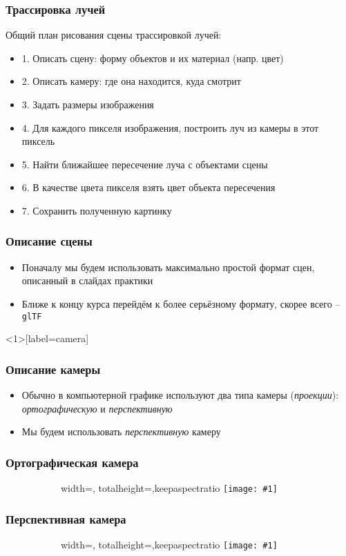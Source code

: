 \documentclass[10pt]{beamer}
\newcommand{\slideimage}[1]{
  \begin{figure}
    \begin{adjustbox}{width=\textwidth, totalheight=\textheight-2\baselineskip-2\baselineskip,keepaspectratio}
      \texttt{[image: \#1]}
    \end{adjustbox}
  \end{figure}
}
\begin{document}
\begin{frame}
\frametitle{Трассировка лучей}
Общий план рисования сцены трассировкой лучей:
\pause
\begin{itemize}
\item 1. Описать сцену: форму объектов и их материал (напр. цвет)
\pause
\item 2. Описать камеру: где она находится, куда смотрит
\pause
\item 3. Задать размеры изображения
\pause
\item 4. Для каждого пикселя изображения, построить луч из камеры в этот пиксель
\pause
\item 5. Найти ближайшее пересечение луча с объектами сцены
\pause
\item 6. В качестве цвета пикселя взять цвет объекта пересечения
\pause
\item 7. Сохранить полученную картинку
\end{itemize}
\end{frame}

\begin{frame}
\frametitle{Описание сцены}
\begin{itemize}
\item Поначалу мы будем использовать максимально простой формат сцен, описанный в слайдах практики
\pause
\item Ближе к концу курса перейдём к более серьёзному формату, скорее всего -- \texttt{glTF}
\end{itemize}
\end{frame}

\begin{frame}<1>[label=camera]
\frametitle{Описание камеры}
\begin{itemize}
\item Обычно в компьютерной графике используют два типа камеры (\textit{проекции}): \textit{ортографическую} и \textit{перспективную}
\pause
\item Мы будем использовать \textit{перспективную} камеру
\end{itemize}
\end{frame}

\begin{frame}
\frametitle{Ортографическая камера}
\begin{figure}
\slideimage{orthographic.png}
\end{figure}
\end{frame}

\begin{frame}
\frametitle{Перспективная камера}
\begin{figure}
\slideimage{perspective.png}
\end{figure}
\end{frame}
\end{document}
